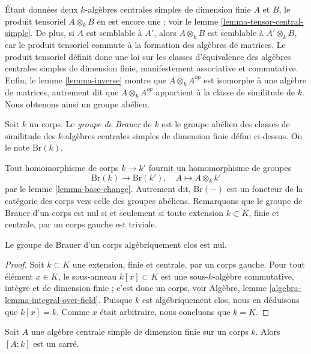\noindent
Étant données deux $k$-algèbres centrales simples de dimension finie $A$ et
$B$, le produit tensoriel $A \otimes_k B$ en est encore une ; voir le
lemme \ref{lemma-tensor-central-simple}.
De plus, si $A$ est semblable à $A'$, alors $A \otimes_k B$ est semblable à
$A' \otimes_k B$, car le produit tensoriel commute à la formation des
algèbres de matrices. Le produit tensoriel définit donc une loi sur les
classes d'équivalence des algèbres centrales simples de dimension finie,
manifestement associative et commutative. Enfin, le
lemme \ref{lemma-inverse}
montre que $A \otimes_k A^{op}$ est isomorphe à une algèbre de matrices,
autrement dit que $A \otimes_k A^{op}$ appartient à la classe de similitude
de $k$. Nous obtenons ainsi un groupe abélien.

\begin{definition}
\label{definition-brauer-group}
Soit $k$ un corps. Le {\it groupe de Brauer} de $k$ est le groupe abélien des
classes de similitude des $k$-algèbres centrales simples de dimension finie
défini ci-dessus. On le note $\text{Br}(k)$.
\end{definition}

\noindent
Tout homomorphisme de corps $k \to k'$ fournit un homomorphisme de groupes
$$
\text{Br}(k) \longrightarrow \text{Br}(k'),\quad
A \longmapsto A \otimes_k k'
$$
par le lemme \ref{lemma-base-change}. Autrement dit, $\text{Br}(-)$ est un
foncteur de la catégorie des corps vers celle des groupes abéliens.
Remarquons que le groupe de Brauer d'un corps est nul si et seulement si toute
extension $k \subset K$, finie et centrale, par un corps gauche est triviale.

\begin{lemma}
\label{lemma-brauer-algebraically-closed}
Le groupe de Brauer d'un corps algébriquement clos est nul.
\end{lemma}

\begin{proof}
Soit $k \subset K$ une extension, finie et centrale, par un corps gauche.
Pour tout élément $x \in K$, le sous-anneau $k[x] \subset K$ est une
sous-$k$-algèbre commutative, intègre et de dimension finie ; c'est donc un
corps, voir Algèbre, lemme \ref{algebra-lemma-integral-over-field}.
Puisque $k$ est algébriquement clos, nous en déduisons que
$k[x] = k$. Comme $x$ était arbitraire, nous concluons que $k = K$.
\end{proof}

\begin{lemma}
\label{lemma-dimension-square}
Soit $A$ une algèbre centrale simple de dimension finie sur un corps $k$.
Alors $[A : k]$ est un carré.
\end{lemma}

